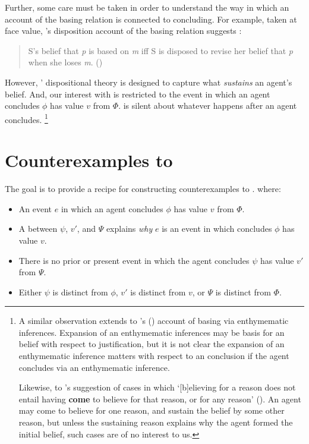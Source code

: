 \begin{note}
  Further, some care must be taken in order to understand the way in which an account of the basing relation is connected to concluding.
  For example, taken at face value, \citeauthor{Evans:2013tw}'s disposition account of the basing relation suggests :

  \begin{quote}
    S's belief that \emph{p} is based on \emph{m} iff S is disposed to revise her belief that \emph{p} when she loses \emph{m}.%
    \mbox{}\hfill\mbox{(\citeyear[2952]{Evans:2013tw})}
  \end{quote}

  However, \citeauthor{Evans:2013tw}' dispositional theory is designed to capture what \emph{sustains} an agent's belief.%
  And, our interest with \issueInclusion{} is restricted to the event in which an agent concludes \(\phi\) has value \(v\) from \(\Phi\).
  \issueInclusion{} is silent about whatever happens after an agent concludes.%
  \footnote{
    A similar observation extends to \citeauthor{Moretti:2019wx}'s (\citeyear{Moretti:2019wx}) account of basing via enthymematic inferences.
    Expansion of an enthymematic inferences may be basis for an \agents{} belief with respect to justification, but it is not clear the expansion of an enthymematic inference matters with respect to an \agents{} conclusion if the agent concludes via an enthymematic inference.

    Likewise, to \citeauthor{Audi:1986to}'s suggestion of cases in which `[b]elieving for a reason does not entail having \textbf{come} to believe for that reason, or for any reason' (\citeyear[32--33]{Audi:1986to}).
    An agent may come to believe for one reason, and sustain the belief by some other reason, but unless the sustaining reason explains why the agent formed the initial belief, such cases are of no interest to us.
  }
\end{note}

\section*{Counterexamples to \issueInclusion{}}

\begin{note}
  The goal is to provide a recipe for constructing counterexamples to \issueInclusion{}.
   where:
  \begin{itemize}
  \item
    An event \(e\) in which an agent \vAgent{} concludes \(\phi\) has value \(v\) from \(\Phi\).
  \item
    A \ros{} between \(\psi\), \(v'\), and \(\Psi\) explains \emph{why} \(e\) is an event in which \vAgent{} concludes \(\phi\) has value \(v\).
  \item
    There is no prior or present event in which the agent concludes \(\psi\) has value \(v'\) from \(\Psi\).
  \item
    Either \(\psi\) is distinct from \(\phi\), \(v'\) is distinct from \(v\), or \(\Psi\) is distinct from \(\Phi\).
  \end{itemize}
\end{note}

